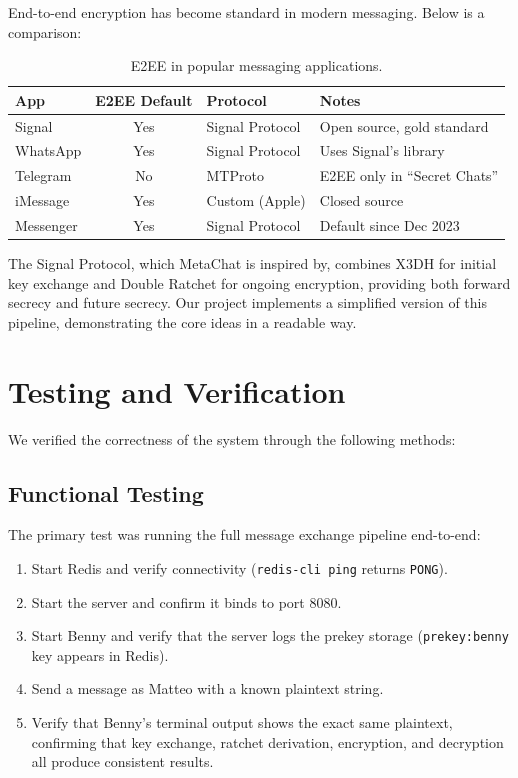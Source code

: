 \documentclass[12pt,a4paper]{article}
\begin{document}
End-to-end encryption has become standard in modern messaging. Below is a comparison:

\begin{table}[H]
\centering
\begin{tabular}{l c l l}
\toprule
\textbf{App} & \textbf{E2EE Default} & \textbf{Protocol} & \textbf{Notes} \\
\midrule
Signal     & Yes & Signal Protocol & Open source, gold standard \\
WhatsApp   & Yes & Signal Protocol & Uses Signal's library \\
Telegram   & No  & MTProto & E2EE only in ``Secret Chats'' \\
iMessage   & Yes & Custom (Apple) & Closed source \\
Messenger  & Yes & Signal Protocol & Default since Dec 2023 \\
\bottomrule
\end{tabular}
\caption{E2EE in popular messaging applications.}
\end{table}

The Signal Protocol, which MetaChat is inspired by, combines X3DH for initial key exchange and Double Ratchet for ongoing encryption, providing both forward secrecy and future secrecy. Our project implements a simplified version of this pipeline, demonstrating the core ideas in a readable way.

\section{Testing and Verification}
\label{sec:testing}

We verified the correctness of the system through the following methods:

\subsection{Functional Testing}

The primary test was running the full message exchange pipeline end-to-end:
\begin{enumerate}
    \item Start Redis and verify connectivity (\texttt{redis-cli ping} returns \texttt{PONG}).
    \item Start the server and confirm it binds to port 8080.
    \item Start Benny and verify that the server logs the prekey storage (\texttt{prekey:benny} key appears in Redis).
    \item Send a message as Matteo with a known plaintext string.
    \item Verify that Benny's terminal output shows the exact same plaintext, confirming that key exchange, ratchet derivation, encryption, and decryption all produce consistent results.
\end{enumerate}
\end{document}
